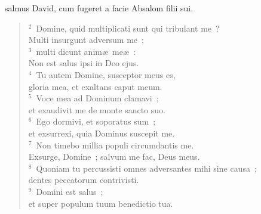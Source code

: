 \bchapter
{}salmus David, cum fugeret a facie Absalom filii sui.
\begin{flushleft}\begin{verse}\vspace{6pt}${}^{2}$~Domine, quid multiplicati sunt qui tribulant me~?\\ Multi insurgunt adversum me~;\\
${}^{3}$~multi dicunt anim\ae\ me\ae~:\\ Non est salus ipsi in Deo ejus.\\
${}^{4}$~Tu autem Domine, susceptor meus es,\\ gloria mea, et exaltans caput meum.\\
${}^{5}$~Voce mea ad Dominum clamavi~;\\ et exaudivit me de monte sancto suo.\\
${}^{6}$~Ego dormivi, et soporatus sum~;\\ et exsurrexi, quia Dominus suscepit me.\\
${}^{7}$~Non timebo millia populi circumdantis me.\\ Exsurge, Domine~; salvum me fac, Deus meus.\\
${}^{8}$~Quoniam tu percussisti omnes adversantes mihi sine causa~;\\ dentes peccatorum contrivisti.\\
${}^{9}$~Domini est salus~;\\ et super populum tuum benedictio tua.\end{verse}\end{flushleft}



